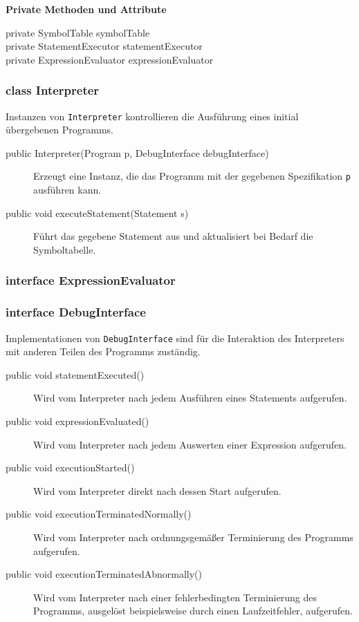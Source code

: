 \textbf{Private Methoden und Attribute}
\begin{description}
    \item[private SymbolTable symbolTable]
    \item[private StatementExecutor statementExecutor]
    \item[private ExpressionEvaluator expressionEvaluator]
\end{description}


\subsubsection{class Interpreter}

Instanzen von \texttt{Interpreter} kontrollieren die Ausführung eines initial übergebenen Programms.

\begin{description}
    \item[public Interpreter(Program p, DebugInterface debugInterface)]
    Erzeugt eine Instanz, die das Programm mit der gegebenen Spezifikation \texttt{p} ausführen kann.

    \item[public void executeStatement(Statement s)]
    Führt das gegebene Statement aus und aktualisiert bei Bedarf die Symboltabelle.
\end{description}


\subsubsection{interface ExpressionEvaluator}
\subsubsection{interface DebugInterface}
Implementationen von \texttt{DebugInterface} sind für die Interaktion des Interpreters mit anderen Teilen des Programms zuständig.

\begin{description}
    \item[public void statementExecuted()]
    Wird vom Interpreter nach jedem Ausführen eines Statements aufgerufen.
    \item[public void expressionEvaluated()]
    Wird vom Interpreter nach jedem Auswerten einer Expression aufgerufen.
    \item[public void executionStarted()]
    Wird vom Interpreter direkt nach dessen Start aufgerufen.
    \item[public void executionTerminatedNormally()]
    Wird vom Interpreter nach ordnungsgemäßer Terminierung des Programms aufgerufen.
    \item[public void executionTerminatedAbnormally()]
    Wird vom Interpreter nach einer fehlerbedingten Terminierung des Programms, ausgelöst beispielsweise durch einen Laufzeitfehler, aufgerufen.
\end{description}
